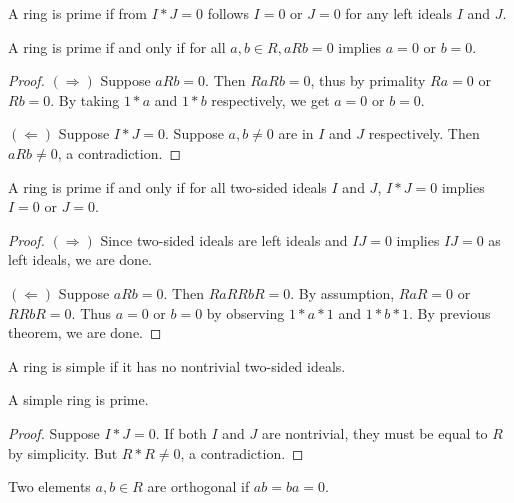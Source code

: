   \begin{definition}
    
    A ring is prime if from $I * J = 0$ follows $I = 0$ or $J = 0$ for any left ideals $I$ and $J$.
  \end{definition}
  \begin{theorem}
    \label{thm:prime_ring_equiv}
    A ring is prime if and only if for all $a, b \in R, aRb = 0$ implies $a = 0$ or $b = 0$.
  \end{theorem}
  \begin{proof}
    $(\Rightarrow)$ Suppose $aRb = 0$. Then $RaRb = 0$, thus by primality $Ra = 0$ or $Rb = 0$. By taking $1 * a$ and $1 * b$ respectively, we get $a = 0$ or $b = 0$.

    $(\Leftarrow)$ Suppose $I * J = 0$. Suppose $a, b \neq 0$ are in $I$ and $J$ respectively. Then $aRb \neq 0$, a contradiction.
  \end{proof}
  \begin{theorem}
    \label{thm:prime_ring_equiv'}
    A ring is prime if and only if for all two-sided ideals $I$ and $J$, $I * J = 0$ implies $I = 0$ or $J = 0$.
  \end{theorem}
  \begin{proof}
    $(\Rightarrow)$ Since two-sided ideals are left ideals and $IJ = 0$ implies $IJ = 0$ as left ideals, we are done.

    $(\Leftarrow)$ Suppose $aRb = 0$. Then $RaRRbR = 0$. By assumption, $RaR = 0$ or $RRbR = 0$. Thus $a = 0$ or $b = 0$ by observing $1 * a * 1$ and $1 * b * 1$. By previous theorem, we are done.
  \end{proof}

  \begin{definition}
    A ring is simple if it has no nontrivial two-sided ideals.
  \end{definition}

  \begin{theorem}
    \label{thm:simple_ring_is_prime}
    A simple ring is prime.
  \end{theorem}
  \begin{proof}
    Suppose $I * J = 0$. If both $I$ and $J$ are nontrivial, they must be equal to $R$ by simplicity. But $R * R \neq 0$, a contradiction.
  \end{proof}

  \begin{definition}
    \label{def:is_semisimple}
    Two elements $a, b \in R$ are orthogonal if $ab = ba = 0$.
  \end{definition}


